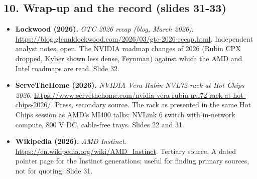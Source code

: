 \subsection*{10. Wrap-up and the record (slides 31-33)}
\begin{itemize}[leftmargin=1.2em,itemsep=3pt]\sloppy
\item \textbf{Lockwood (2026).} \textit{GTC 2026 recap (blog, March 2026)}. \url{https://blog.glennklockwood.com/2026/03/gtc-2026-recap.html}. Independent analyst notes, open. The NVIDIA roadmap changes of 2026 (Rubin CPX dropped, Kyber shown less dense, Feynman) against which the AMD and Intel roadmaps are read. Slide 32.
\item \textbf{ServeTheHome (2026).} \textit{NVIDIA Vera Rubin NVL72 rack at Hot Chips 2026}. \url{https://www.servethehome.com/nvidia-vera-rubin-nvl72-rack-at-hot-chips-2026/}. Press, secondary source. The rack as presented in the same Hot Chips session as AMD's MI400 talks: NVLink 6 switch with in-network compute, 800 V DC, cable-free trays. Slides 22 and 31.
\item \textbf{Wikipedia (2026).} \textit{AMD Instinct}. \url{https://en.wikipedia.org/wiki/AMD_Instinct}. Tertiary source. A dated pointer page for the Instinct generations; useful for finding primary sources, not for quoting. Slide 31.
\end{itemize}
